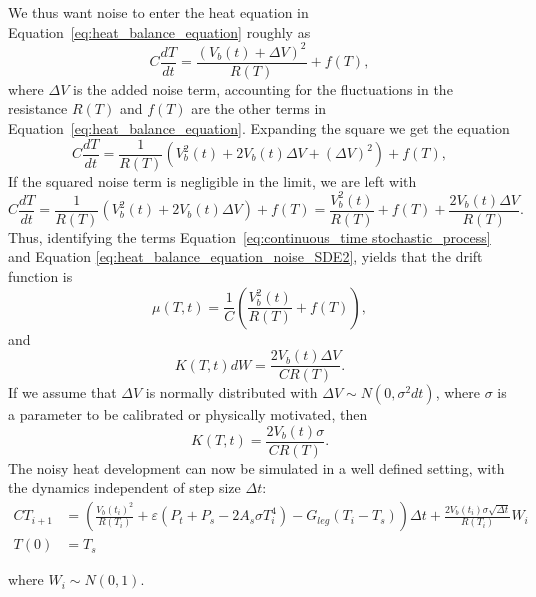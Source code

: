 We thus want noise to enter the heat equation in Equation~\eqref{eq:heat_balance_equation}
roughly as
\begin{equation}
  \label{eq:heat_balance_equation_noise}
  C\frac{dT}{dt}=\frac{(V_b(t) + \Delta V)^2}{R(T)}+ f(T),
\end{equation}
where $\Delta V$ is the added noise term, accounting for the
fluctuations in the resistance $R(T)$ and $f(T)$ are the other terms
in Equation~\eqref{eq:heat_balance_equation}.
Expanding the square we get the equation
\begin{equation}
  \label{eq:heat_balance_equation_noise_SDE1}
  C\frac{dT}{dt}=\frac{1}{R(T)} (V_b^2(t) + 2 V_b(t) \Delta V + (\Delta V)^2) + f(T),
\end{equation}
If the squared noise term is negligible in the limit, we are left with
\begin{equation}
  \label{eq:heat_balance_equation_noise_SDE2}
  C\frac{dT}{dt}=\frac{1}{R(T)} (V_b^2(t) + 2 V_b(t) \Delta V  ) +
  f(T) = \frac{V_b^2(t)}{R(T)} + f(T) +  \frac{2 V_b(t) \Delta V}{R(T)}.
\end{equation}
Thus, identifying the terms Equation~\eqref{eq:continuous_time stochastic_process} and Equation
\eqref{eq:heat_balance_equation_noise_SDE2}, yields that the drift
function is
\begin{equation}
  \label{eq:drift_function}
  \mu(T,t) = \frac{1}{C} \left( \frac{V_b^2(t)}{R(T)} + f(T) \right),
\end{equation}
and
\begin{equation}
  \label{eq:variance_function}
  K(T,t)dW = \frac{2 V_b(t) \Delta V}{CR(T)}.
\end{equation}
If we assume that $\Delta V$ is normally distributed with $\Delta V
\sim N(0, \sigma^2 dt)$, where $\sigma$ is a parameter to be calibrated or
physically motivated, then
\begin{equation}
  \label{eq:variance_function}
  K(T,t) = \frac{2 V_b(t) \sigma }{CR(T)}.
\end{equation}
The noisy heat development can now be simulated
in a well defined setting, with the dynamics independent of step size $\Delta t$:
\begin{align} \label{eq:heat_balance_equation_noise_discr}
 CT_{i+1}&=\left(\frac{V_b(t_{i})^2}{R(T_{i})}+\varepsilon(P_t+P_s -2A_s \sigma T_i^4)-G_{leg}(T_i-T_s)\right)\Delta t + \frac{2 V_b(t_i) \sigma \sqrt{\Delta t}}{R(T_{i})} W_i \\
 T(0)&=T_s	\nonumber
\end{align}

where $W_i \sim N(0,1)$.


